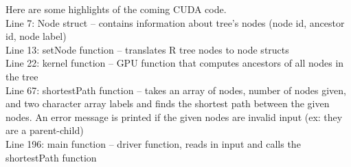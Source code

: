 \documentclass[11pt,letterpaper]{article}
\begin{document}
Here are some highlights of the coming CUDA code.\\

Line 7: Node struct – contains information about tree's nodes (node id, ancestor id, node label) \\

Line 13: setNode function – translates R tree nodes to node structs \\

Line 22: kernel function – GPU function that computes ancestors of all nodes in the tree \\

Line 67: shortestPath function – takes an array of nodes, number of nodes given, and two character array labels and finds the shortest path between the given nodes. An error message is printed if the given nodes are invalid input (ex: they are a parent-child) \\

Line 196: main function – driver function, reads in input and calls the shortestPath function \\
\end{document}
